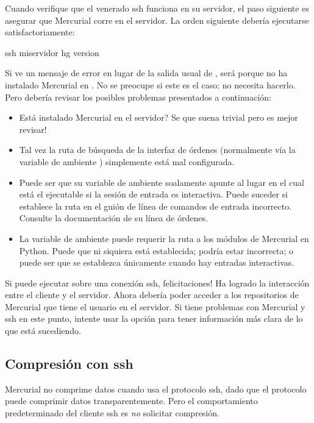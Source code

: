 Cuando verifique que el venerado ssh funciona en su servidor, el
paso siguiente es asegurar que Mercurial corre en el servidor.  La
orden siguiente debería ejecutarse satisfactoriamente:
\begin{codesample2}
  ssh miservidor hg version
\end{codesample2}
Si ve un mensaje de error en lugar de la salida usual de 
, será porque no ha instalado Mercurial en
.  No se preocupe si este es el caso; no necesita
hacerlo.  Pero debería revisar los posibles problemas presentados a
continuación:
\begin{itemize}
\item Está instalado Mercurial en el servidor?  Se que suena trivial
  pero es mejor revisar!
\item Tal vez la ruta de búsqueda de la interfaz de órdenes
  (normalmente vía la variable de ambiente ) simplemente
  está mal configurada.
\item Puede ser que su variable de ambiente  soalamente
  apunte al lugar en el cual está el ejecutable  si la
  sesión de entrada es interactiva.  Puede suceder si establece la
  ruta en el guión de línea de comandos de entrada incorrecto.  Consulte la
  documentación de su línea de órdenes.
\item La variable de ambiente  puede requerir la
  ruta a los módulos de Mercurial en Python.  Puede que ni siquiera
  está establecida; podría estar incorrecta; o puede ser que se
  establezca únicamente cuando hay entradas interactivas.
\end{itemize}

Si puede ejecutar  sobre una conexión ssh,
felicitaciones!  Ha logrado la interacción entre el cliente y el 
servidor.  Ahora debería poder acceder a los repositorios de
Mercurial que tiene el usuario en el servidor.  Si tiene problemas
con Mercurial y ssh en este punto, intente usar la opción
 para tener información más clara de lo que está
sucediendo.

\subsection{Compresión con ssh}

Mercurial no comprime datos cuando usa el protocolo ssh, dado que
el protocolo puede comprimir datos transparentemente.  Pero el
comportamiento predeterminado del cliente ssh es \emph{no}
solicitar compresión.


